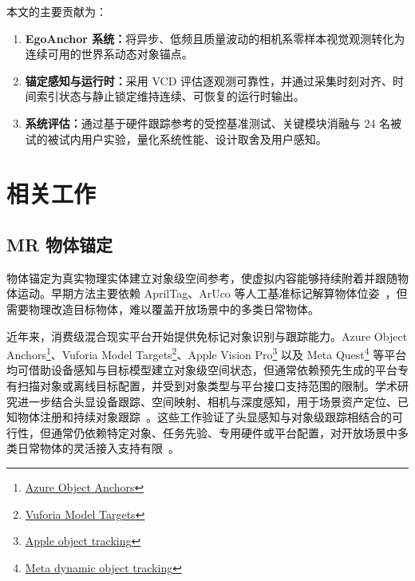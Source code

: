 \documentclass[review]{vgtc}
\begin{document}
本文的主要贡献为：
\begin{enumerate}[leftmargin=1.8em,itemsep=1pt,topsep=2pt]
  \item \textbf{EgoAnchor 系统：}将异步、低频且质量波动的相机系零样本视觉观测转化为连续可用的世界系动态对象锚点。
  \item \textbf{锚定感知与运行时：}采用 VCD 评估逐观测可靠性，并通过采集时刻对齐、时间索引状态与静止锁定维持连续、可恢复的运行时输出。
  \item \textbf{系统评估：}通过基于硬件跟踪参考的受控基准测试、关键模块消融与 24 名被试的被试内用户实验，量化系统性能、设计取舍及用户感知。
\end{enumerate}

\section{相关工作}\label{sec:related-work}

\subsection{MR 物体锚定}

物体锚定为真实物理实体建立对象级空间参考，使虚拟内容能够持续附着并跟随物体运动。早期方法主要依赖 AprilTag、ArUco 等人工基准标记解算物体位姿~\cite{apriltag2011,aruco2014}，但需要物理改造目标物体，难以覆盖开放场景中的多类日常物体。

近年来，消费级混合现实平台开始提供免标记对象识别与跟踪能力。Azure Object Anchors\footnote{\href{https://learn.microsoft.com/en-us/dynamics365/mixed-reality/guides/pc-app-anchor-object}{Azure Object Anchors}}、Vuforia Model Targets\footnote{\href{https://developer.vuforia.com/library/vuforia-engine/images-and-objects/model-targets/model-targets/}{Vuforia Model Targets}}、Apple Vision Pro\footnote{\href{https://developer.apple.com/documentation/visionos/implementing-object-tracking-in-your-app}{Apple object tracking}} 以及 Meta Quest\footnote{\href{https://developers.meta.com/horizon/documentation/native/android/mobile-dynamic-object-tracker/}{Meta dynamic object tracking}} 等平台均可借助设备感知与目标模型建立对象级空间状态，但通常依赖预先生成的平台专有扫描对象或离线目标配置，并受到对象类型与平台接口支持范围的限制。学术研究进一步结合头显设备跟踪、空间映射、相机与深度感知，用于场景资产定位、已知物体注册和持续对象跟踪~\cite{fan2021assettracking,doughty2022hmdegopose,pollabauer2023hololens,martingomez2024sttar,trojak2025mixedpose,greene2025markerless,trojak2026markerless,gbot2024}。这些工作验证了头显感知与对象级跟踪相结合的可行性，但通常仍依赖特定对象、任务先验、专用硬件或平台配置，对开放场景中多类日常物体的灵活接入支持有限~\cite{hurt2025surrealitycv}。
\end{document}
